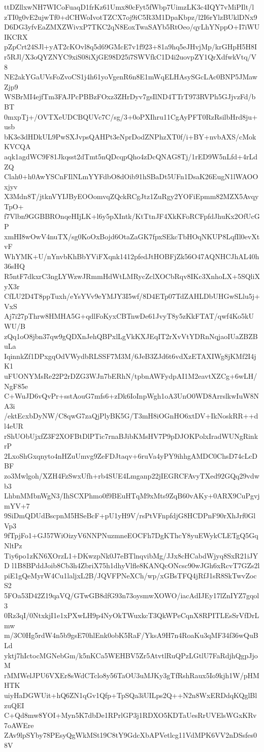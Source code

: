 ttDZllxwNH7WICoFuaqD1frKz61Umx80cFyt5fWbp7UimzLK3c4IQY7vMiPIlt/l
zTI0g0vE2ujwTf0+dCHWoIvotTZCX7oj9iC5R3M1DpaKbpz/l2I6rYlzBUklDNx9
D6DG3yfvEaZMXZWivxP7TKC2qN8EoxTwaSAYb5RtOeo/qyLhYNppO+I7iWUIKCRX
pZpCrt24SJl+yAT2cKOvl8q5d69GMcE7v1f923+81a9hq5eJHvjMp/krGHpH5H8I
r5RJl/X3oQYZNYC9xiS08iXjGE98D25i7SWVfkC1D4i2uovpZY1QrXdfwkVtq/V8
NE2akYGaUVsFoZvoCS1j4h61yoVgenR6n8E1mWqELHAsySGcLAc0BNP5JMawZjp9
WSBrMI4ejfTm3FAJPcPBBzFOxz3ZHrDyv7gsIlND4TTrT973RVPh5GJjvzFd/bBT
0mxpTj+/OVTXeUDCBQUVc7C/sg/3+0oPXIhru11CgAyPFT0RzRsilbHrd8ju+usb
bK3e3dHDkUL9PwSXJvpsQAHPt3eNprDodZNPhzXT0f/i+BY+nvbAXS/cMokKVCQA
aqk1agdWC9F81Jkqsst2dTmt5nQDcqpQho4zDcQNAG8Tj/1rED9W5nLfd+4rLdZQ
Clah0+h0AwYSCnFIlNLmYYFdbO8dOib91hSBaDt5UFn1DsaK26EugN1lWAOOxjyv
X3Mdn8T/jtknVYIJByEOOomvqZQckRCgJtz1ZuRgy2YOFiEpmm82MZX5AvqyTpO+
f7Vlbn9GGBBROnqeHIjLK+l6y5pXIntk/KtTtnJF4XkKFoRCFpfdJhuKx2OfUcGP
xmHI8wOwV4nuTX/sg0KoOxBojd6OtaZaGK7fpxSEkcTbHOqNKUP8LqfIl0evXtvF
WhYMK+U/nYnvbKhBbYViFXqnk1412pfedJtHOBFjZk56O47AQNHCJhAL40h36sHQ
R5ntF7dkxrC3ngLYWzwJRmmHdWtLMRycZclXOCbRqv8IKc3XnhoLX+5SQliXyX3r
CfLU2D4T8ppTuxh/eYsYVv9eYMJY3I5wf/8D4ETp07TdZAHLDbUHGwSLlu5j+VxS
Aj7i27pThrw8HMHA5G+qdlFoKyxCBTnwDe61JvyT8y5zKkFTAT/qwf4Ko5kUWU/B
zQq1oO8jbn37qw9gQDXnJehQBPxlLgVkKXJEqIT2rXvVtYDRnNqjaoIUaZBZBuLa
IqinnkZf1DPxgqOdVWydbRLSSF7M3M/6JeB3ZJd6t6vdXzETAXIWg8jKMf2I4jK1
uFUONYMsRe22P2rDZG3WJn7bERhN/tpbnAWFydpAI1M2eavtXZCg+6wLH/NgF85e
C+WuJD6vQvPr+sstAouG7mfs6+zDk6IoInpWgh1oA3UnO0WD8ArrslkwIuW8NA3i
/ektEcxbDyNW/C8qwG7zaQjPlyBK5G/T3mH8iOGnHO6xtDV+IkNoskRR++dl4eUR
rShUObUjxfZ3F2XOFBtDlPTic7rnaBJibKMsHV7P9pDJOKPolxIradWUNgRinkrP
2LxoShGxqnyto4nHZuUmvg9ZeFDJtaqv+6ruVa4yPY9ihhgAMDC0ChsD74cLcDBF
zo3Mwlgoh/XZH4FzSwxUfh+rb4SUE4Lmganp22jIEGRCFAvyTXed92GQq29vdwb3
LhbnMMbnWgN3/IhSCXPhmo0f9BEuHTqM9xMts9ZqB60vAKy+0ARX9CuPgvjmYV+7
9SiDmQDUdBscpnM5HSeBcF+pU1yH9V/rsPtVFnpfdjG8HCDPnF90rXhJrf0GlVp3
9fTpjFo1+GJ57WiOizyV6NNPNuzmneEOCFh7DgKThcY8yuEWykCLETgQ5GqNltPz
Tiy6po1zKN6XOrzL1+DKwzpNk0J7eBTlnqvibMg/JJx8cHCabdWjyq8SxR21iJYD
l1B8BPddJoib8Cb3h4ZbriX75h1dhyVlfle8KANQcONcsc90wJGh6xRcvT7GZs2l
piE1gQeMyrW4Cu1laljxL2B/JQVFPNeXCh/wp/xGBsTFQ4jRfJ1sR8SkTwvZocS2
5FOa53D42Z19qaVQ/GTwGB8dfG93n73oysmwXOWO/iacAdIJEy17lZnIYZ7gqol3
0Rz3qI/0NtxkjI1e1xPXwLH9p4NyOkTWuxkcT3QkWPeCqnX8RPITLEsSrVfDrLmw
m/3C0Hg5rdW4n5b9gsE70hlEnk0obK5RaF/YksA9H7n4RoaKu3qMF34f36wQuBLd
yktj7hIctocMGNebGm/k5nKCa5WEHBV5Zr5AtvtlRuQPzLGtlU7FaRdjhQgpJjoM
rMMWelJPU6VXEr8sWdCTclo8y56TaOU3uMJKy3gTfRshRaux5Io9kjh1W/pHMHTK
uiyHaDGWUit+hQ6ZN1qGv1Qfp+TpSQa3iUILps2Q++N2n8WxERDdqKQglBlzuQEI
C+Qd8mw8YOI+Myn5K7dbDe1RPrlGP3j1RDXO5KDTaUesRrUVElsWGxKRv7oAWEre
ZAv9lpSYby78PEsyQgWkMSt19C8tY9GdcXbAPVetlcg11VdMPK6VV2nDSsfes08V
